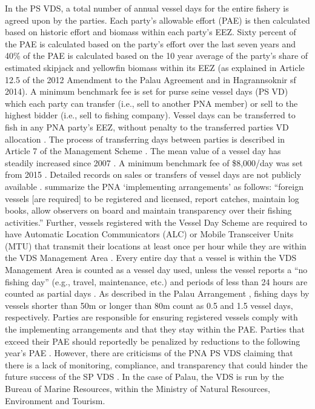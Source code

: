 \documentclass[9pttwoside,lineno]{pnas-new}
\begin{document}
In the PS VDS, a total number of annual vessel days for the entire fishery is agreed upon by the parties. Each party’s allowable effort (PAE) is then calculated based on historic effort and biomass within each party’s EEZ. Sixty percent of the PAE is calculated based on the party’s effort over the last seven years and 40\% of the PAE is calculated based on the 10 year average of the party’s share of estimated skipjack and yellowfin biomass within its EEZ (as explained in Article 12.5 of the 2012 Amendment to the Palau Agreement and in Hagrannsoknir sf 2014). 
A minimum benchmark fee is set for purse seine vessel days (PS VD) which each party can transfer (i.e., sell to another PNA member) or sell to the highest bidder (i.e., sell to fishing company). Vessel days can be transferred to fish in any PNA party’s EEZ, without penalty to the transferred parties VD allocation \citep{PNA2016}. The process of transferring days between parties is described in Article 7 of the Management Scheme \citep{PNA2016}. The mean value of a vessel day has steadily increased since 2007 \citep{havice_2013}. A minimum benchmark fee of \$8,000/day was set from 2015 \citep{PNA2014a}. Detailed records on sales or transfers of vessel days are not publicly available \citep{havice_2013,yeeting2018stabilising}. 
\cite{yeeting2018stabilising} summarize the PNA ‘implementing arrangements’ as follows: “foreign vessels [are required] to be registered and licensed, report catches, maintain log books, allow observers on board and maintain transparency over their fishing activities.” Further, vessels registered with the Vessel Day Scheme are required to have Automatic Location Communicators (ALC) or Mobile Transceiver Units (MTU) that transmit their locations at least once per hour while they are within the VDS Management Area \citep{PNA2016}. Every entire day that a vessel is within the VDS Management Area is counted as a vessel day used, unless the vessel reports a “no fishing day” (e.g., travel, maintenance, etc.) and periods of less than 24 hours are counted as partial days \citep{PNA2016}.  As described in the Palau Arrangement \citep{PNA2016}, fishing days by vessels shorter than 50m or longer than 80m count as 0.5 and 1.5 vessel days, respectively. Parties are responsible for ensuring registered vessels comply with the implementing arrangements and that they stay within the PAE. Parties that exceed their PAE should reportedly be penalized by reductions to the following year’s PAE \citep{PNA2016}. However, there are criticisms of the PNA PS VDS claiming that there is a lack of monitoring, compliance, and transparency that could hinder the future success of the SP VDS \citep{Arnason2014,yeeting2018stabilising}. In the case of Palau, the VDS is run by the Bureau of Marine Resources, within the Ministry of Natural Resources, Environment and Tourism.
\end{document}
